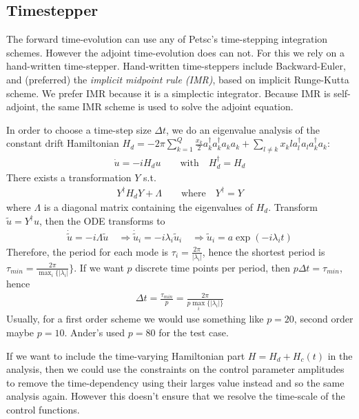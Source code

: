\documentclass[letterpaper]{article}
\begin{document}
  \subsection{Timestepper}
    The forward time-evolution can use any of Petsc's time-stepping integration schemes. However the adjoint time-evolution does can not. For this we rely on a hand-written time-stepper. Hand-written time-steppers include Backward-Euler, and (preferred) the \textit{implicit midpoint rule (IMR)}, based on implicit Runge-Kutta scheme. We prefer IMR because it is a simplectic integrator. Because IMR is self-adjoint, the same IMR scheme is used to solve the adjoint equation. 

    In order to choose a time-step size $\Delta t$, we do an eigenvalue analysis of the constant drift Hamiltonian $H_d =  -2\pi \sum_{k=1}^Q \frac{x_k}{2} a_k^{\dagger}a_k^{\dagger}a_ka_k + \sum_{l\neq k} x_kl a_l^{\dagger}a_l a_k^{\dagger}a_k$:
       \begin{align*}  
         \dot u = -i H_d u \qquad \text{with} \quad H_d^{\dagger}  = H_d
       \end{align*} 
       There exists a transformation $Y$ s.t. 
       \begin{align*}
         Y^{\dagger}H_d Y + \Lambda \qquad  \text{where} \quad Y^{\dagger} = Y
       \end{align*}
       where $\Lambda$ is a diagonal matrix containing the eigenvalues of $H_d$. Transform $\tilde u = Y^{\dagger} u$, then the ODE transforms to 
       \begin{align*}
         \dot \tilde u = -i \Lambda \tilde u \quad \Rightarrow \dot \tilde u_i = -i\lambda_i \tilde u_i \quad \Rightarrow \tilde u_i = a \exp(-i\lambda_i t)
       \end{align*}
       Therefore, the period for each mode is $\tau_i = \frac{2\pi}{|\lambda_i|}$, hence the shortest period is $\tau_{min} = \frac{2\pi}{\max_i\{|\lambda_i|}\}$. If we want $p$ discrete time points per period, then $p\Delta t = \tau_{min}$, hence 
       \begin{align*}
         \Delta t = \frac{\tau_{min}}{p} = \frac{2\pi}{p\max_i\{|\lambda_i|\}}
       \end{align*}
       Usually, for a first order scheme we would use something like $p=20$, second order maybe $p=10$. Ander's used $p=80$ for the test case. 

       If we want to include the time-varying Hamiltonian part $H = H_d + H_c(t)$ in the analysis, then we could use the constraints on the control parameter amplitudes to remove the time-dependency using their larges value instead and so the same analysis again. However this doesn't ensure that we resolve the time-scale of the control functions. 
\end{document}
